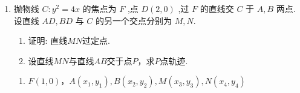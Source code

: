 \begin{enumerate}
\begin{jieda}






        \ps 圆锥曲线统一结论：焦点弦一顶点在准线上的射影和另一顶点连线过焦点到准线的垂线段的中点.
    \end{jieda}
    
    \item 抛物线 $C : y^2 = 4x$ 的焦点为 $F$ ,点 $D\left(2, 0\right)$ ,过 $F$ 的直线交 $C$ 于 $A,B$ 两点. 设直线 ${AD},{BD}$ 与 $C$ 的另一个交点分别为 $M,N$.
    \begin{enumerate}
        \item 证明: 直线$MN$过定点.
        \item 设直线$MN$与直线$AB$交于点$P$，求$P$点轨迹.
    \end{enumerate}
    \begin{jieda}
        \begin{enumerate}
            \item $F(1, 0)$，$A(x_1, y_1), B(x_2, y_2), M(x_3, y_3), N(x_4, y_4)$
            

\end{enumerate}
\end{jieda}
\end{enumerate}
